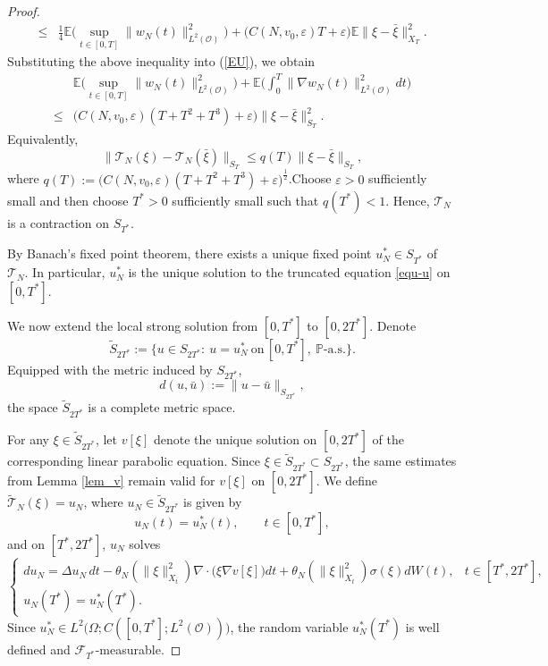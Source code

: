 \documentclass[reqno, 11pt]{amsart}
\theoremstyle{definition}
\numberwithin{equation}{section} \numberwithin{lem}{section}
\numberwithin{thm}{section} \numberwithin{prop}{section}
\numberwithin{cor}{section} \numberwithin{rem}{section}
\numberwithin{defn}{section}
\begin{document}
\begin{proof}
\begin{align*}
        \le &\frac{1}{4}\mathbb{E}\Big(\sup_{t\in[0,T]}\|{w_N}(t)\|_{L^2(\mathcal {O})}^2\Big)+\big(C(N,v_0,\varepsilon)T+\varepsilon\big)\mathbb{E}\|\xi-\bar \xi\|_{X_T}^2.
    \end{align*}
   Substituting the above inequality into (\ref{EU}), we obtain
   \begin{align*}
&\mathbb{E}\Big(\sup_{t\in[0,T]}\|{w_N}(t)\|_{L^2(\mathcal {O})}^2\Big)+\mathbb{E}\Big(\int_0^T\|\nabla {w_N}(t)\|_{L^2(\mathcal {O})}^2dt\Big)\\
\le& \big(C(N,v_0,\varepsilon)(T+T^2+T^3)+\varepsilon\big)\|\xi-\bar \xi\|_{S_T}^2.
    \end{align*}
Equivalently,
\[
\|\mathcal T_N(\xi)-\mathcal T_N(\bar\xi)\|_{S_T}
\le q(T)\|\xi-\bar \xi\|_{S_T},
\]
where $q(T):=\big(C(N,v_0,\varepsilon)(T+T^2+T^3)+\varepsilon\big)^\frac{1}{2}$.Choose $\varepsilon>0$ sufficiently small and then choose $T^*>0$
sufficiently small such that $q(T^*)<1$.
Hence, $\mathcal T_N$ is a contraction on $S_{T^*}$. 

By Banach's fixed point theorem, there exists a unique fixed point $u_N^*\in S_{T^*}$ of $\mathcal T_N$. In particular, $u_N^*$ is the unique solution to the truncated equation \eqref{equ-u} on $[0,T^*]$.

We now extend the local strong solution from $[0,T^*]$ to $[0,2T^*]$. Denote
\[
\widetilde S_{2T^*}
:=
\Big\{
u\in S_{2T^*}:\ u=u_N^*\ \text{on}\,[0,T^*],\ \mathbb P\text{-a.s.}
\Big\}.
\]
Equipped with the metric induced by $S_{2T^*}$,
\[
d(u,\bar u):=\|u-\bar u\|_{S_{2T^*}},
\]
the space $\widetilde S_{2T^*}$ is a complete metric space.

For any $\xi\in \widetilde S_{2T^*}$, let $v[\xi]$ denote the unique solution on $[0,2T^*]$ of the corresponding linear parabolic equation. Since $\xi\in \widetilde S_{2T^*}\subset S_{2T^*}$,    the same estimates from Lemma \ref{lem_v}    remain valid for $v[\xi]$ on $[0,2T^*]$.
We define $\widetilde{\mathcal T}_N(\xi)=u_N$, where $u_N\in \widetilde S_{2T^*}$ is given by
\[
u_N(t)=u_N^*(t),\qquad t\in[0,T^*],
\]
and on $[T^*,2T^*]$, $u_N$ solves
\begin{equation}\label{equ-u2}
\begin{cases}
du_N=\Delta u_N\,dt-\theta_N(\|\xi\|_{X_t}^2)\nabla\cdot\bigl(\xi\nabla v[\xi]\bigr)dt+\theta_N(\|\xi\|_{X_t}^2)\sigma(\xi)dW(t),
& t\in[T^*,2T^*],\\
u_N(T^*)=u_N^*(T^*).
\end{cases}
\end{equation}
Since $u_N^*\in L^2\big(\Omega;C([0,T^*];L^2(\mathcal {O}))\big)$,
the random variable $u_N^*(T^*)$ is well defined and $\mathcal F_{T^*}$-measurable.


\end{proof}
\end{document}
